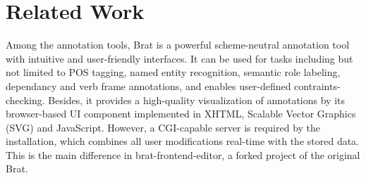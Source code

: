 \documentclass[a4paper]{article}
\begin{document}
\section{Related Work}
Among the annotation tools, Brat is a powerful scheme-neutral annotation tool with intuitive and user-friendly interfaces. \cite{stenetorp-etal-2012-brat} It can be used for tasks including but not limited to POS tagging, named entity recognition, semantic role labeling, dependancy and verb frame annotations, and enables user-defined contraints-checking. Besides, it provides a high-quality visualization of annotations by its browser-based UI component implemented in XHTML, Scalable Vector Graphics (SVG) and JavaScript. However, a CGI-capable server is required by the installation, which combines all user modifications real-time with the stored data. This is the main difference in brat-frontend-editor, a forked project of the original Brat. \cite{brat-frontend-editor}
\end{document}
